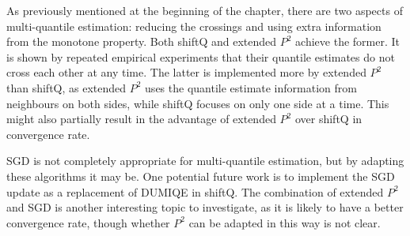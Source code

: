 As previously mentioned at the beginning of the chapter, there are two aspects of multi-quantile estimation: reducing the crossings and using extra information from the monotone property. Both shiftQ and extended $P^2$ achieve the former. It is shown by repeated empirical experiments that their quantile estimates do not cross each other at any time. The latter is implemented more by extended $P^2$ than shiftQ, as extended $P^2$ uses the quantile estimate information from neighbours on both sides, while shiftQ focuses on only one side at a time. This might also partially result in the advantage of extended $P^2$ over shiftQ in convergence rate.

SGD is not completely appropriate for multi-quantile estimation, but by adapting these algorithms it may be. One potential future work is to implement the SGD update as a replacement of DUMIQE in shiftQ. The combination of extended $P^2$ and SGD is another interesting topic to investigate, as it is likely to have a better convergence rate, though whether $P^2$ can be adapted in this way is not clear.